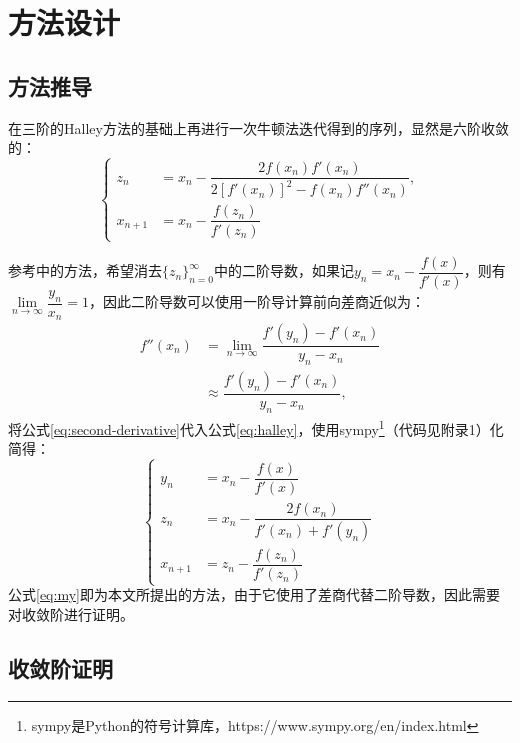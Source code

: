 
\section{方法设计}

\subsection{方法推导}

在三阶的Halley方法的基础上再进行一次牛顿法迭代得到的序列，显然是六阶收敛的：
\begin{equation}
    \label{eq:halley}
    \begin{cases}
        z_n &= x_n - \dfrac{2f(x_n)f'(x_n)}{2[f'(x_n)]^2-f(x_n)f''(x_n)}, \\
        x_{n+1} &= x_n - \dfrac{f(z_n)}{f'(z_n)}   
    \end{cases}
\end{equation}

参考\cite{eftekhari2014new}中的方法，希望消去$\{z_n\}_{n=0}^\infty$中的二阶导数，如果记$y_n = x_n - \dfrac{f(x)}{f'(x)}$，则有$\lim\limits_{n\to \infty}\dfrac{y_n}{x_n} = 1$，因此二阶导数可以使用一阶导计算前向差商近似为：
\begin{equation}
    \label{eq:second-derivative}
    \begin{aligned}
        f''(x_n) &= \lim\limits_{n\to \infty}\dfrac{f'(y_n) - f'(x_n)}{y_n - x_n}\\ 
        &\approx \dfrac{f'(y_n) - f'(x_n)}{y_n - x_n},
    \end{aligned}
\end{equation}
将公式\ref{eq:second-derivative}代入公式\ref{eq:halley}，使用sympy\footnote{sympy是Python的符号计算库，https://www.sympy.org/en/index.html}（代码见附录1）化简得：
\begin{equation}
    \label{eq:my}
    \begin{cases}
        y_n &= x_n - \dfrac{f(x)}{f'(x)} \\
        z_n &= x_n - \dfrac{2f(x_n)}{f'(x_n) + f'(y_n)} \\
        x_{n+1} &= z_n - \dfrac{f(z_n)}{f'(z_n)}
    \end{cases}
\end{equation}
公式\ref{eq:my}即为本文所提出的方法，由于它使用了差商代替二阶导数，因此需要对收敛阶进行证明。

\subsection{收敛阶证明}

